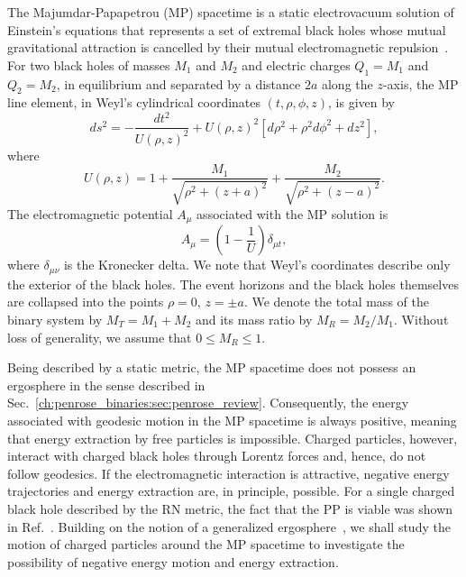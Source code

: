 The Majumdar-Papapetrou (\ac{MP}) spacetime is a static electrovacuum solution of Einstein's equations that represents a set of extremal black holes whose mutual gravitational attraction is cancelled by their mutual electromagnetic repulsion~\cite{MAJUMDAR1947,PAPAPETROU1947,HARTLE1972}.
For two black holes of masses $M_1$ and $M_2$ and electric charges $Q_1=M_1$ and $Q_2=M_2$, in equilibrium and separated by a distance $2a$ along the $z$-axis, the \ac{MP} line element, in Weyl's cylindrical coordinates $(t,\rho,\phi,z)$, is given by~\cite{SMERAK2016}
\begin{equation}
  d s^2 = - \frac{d t^2}{U(\rho,z)^{2}} + U(\rho,z)^2\left[d\rho^2 + \rho^2 d\phi^2 + d z^2\right],
  \label{eq:majumdar_papapetrou_line_element}
\end{equation}
%
where
\begin{equation}
  U(\rho,z) = 1 + \frac{M_1}{\sqrt{\rho^2 + (z+a)^2}} + \frac{M_2}{\sqrt{\rho^2 + (z-a)^2}}.
  \label{eq:mp_metric_potential_cylindric}
\end{equation}
The electromagnetic potential $A_\mu$ associated with the \ac{MP} solution is
\begin{equation}
  A_\mu = \left(1 - \frac{1}{U}\right) \delta_{\mu t},
  \label{eq:electromagnetic_potential_mp}
\end{equation}
where $\delta_{\mu \nu}$ is the Kronecker delta. We note that Weyl's coordinates describe only the exterior of the black holes. The event horizons and the black holes themselves are collapsed into the points $\rho=0, \, z=\pm a$. We denote the total mass of the binary system by $M_T=M_1+M_2$ and its mass ratio by $M_R=M_2/M_1$. Without loss of generality, we assume that $0 \le M_R \le 1$.

Being described by a static metric, the \ac{MP} spacetime does not possess an ergosphere in the sense described in Sec.~\ref{ch:penrose_binaries:sec:penrose_review}. Consequently, the energy associated with geodesic motion in the \ac{MP} spacetime is always positive, meaning that energy extraction by free particles is impossible. Charged particles, however, interact with charged black holes through Lorentz forces and, hence, do not follow geodesics.
If the electromagnetic interaction is attractive, negative energy trajectories and energy extraction are, in principle, possible. For a single charged black hole described by the RN metric, the fact that the \ac{PP} is viable was shown in Ref.~\cite{DENARDO1973}. Building on the notion of a generalized ergosphere~\cite{RUFFINI1971,DENARDO1973}, we shall study the motion of charged particles around the \ac{MP} spacetime to investigate the possibility of negative energy motion and energy extraction.

